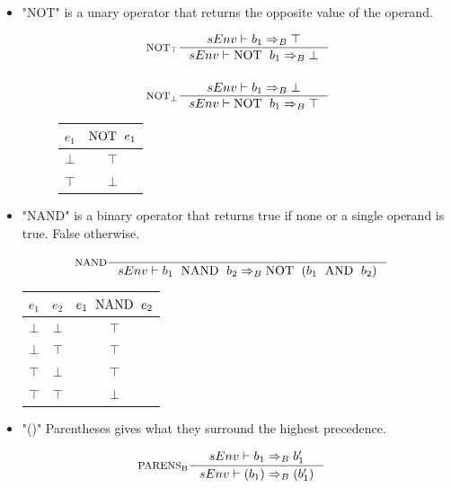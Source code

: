 \begin{itemize}
\item "NOT" is a unary operator that returns the opposite value of the operand.

\begin{figure}[H]
\centering
\begin{minipage}[c]{0.45\linewidth}
\centering
\begin{align*}
&\inference[$\text{NOT}_\top$]{sEnv \vdash b_1 \Rightarrow_B \top}
                       {sEnv \vdash \Tnot b_1 \Rightarrow_B \bot}
\\\\
&\inference[$\text{NOT}_\bot$]{sEnv \vdash b_1 \Rightarrow_B \bot}
                       {sEnv \vdash \Tnot b_1 \Rightarrow_B \top}
\end{align*}
\end{minipage}
\quad
\begin{minipage}[c]{0.45\linewidth}
\centering
\begin{tabular}{ | c | c | }
\hline
$e_1$ & $ \text{NOT \;} e_1$ \\\hline
$\bot$ & $\top$ \\\hline
$\top$ & $\bot$ \\\hline
\end{tabular}
\end{minipage}
\end{figure}

\item "NAND" is a binary operator that returns true if none or a single operand is true. False otherwise.

\begin{align*}
&\inference[NAND]{}
                   {sEnv \vdash b_1 \Tnand b_2 \Rightarrow_B \Tnot( b_1 \Tand b_2 )}
\end{align*}

\begin{center}
\begin{tabular}{ | c | c | c | }
\hline
$e_1$ & $e_2$ & $e_1 \text{\; NAND \;} e_2$ \\\hline
$\bot$ & $\bot$ & $\top$ \\\hline
$\bot$ & $\top$ & $\top$ \\\hline
$\top$ & $\bot$ & $\top$ \\\hline
$\top$ & $\top$ & $\bot$ \\\hline
\end{tabular}
\end{center}

\item "()" Parentheses gives what they surround the highest precedence.
  
\begin{align*}
&\inference[$\text{PARENS}_\text{B}$]{sEnv \vdash b_1 \Rightarrow_B b_1'}
                       {sEnv \vdash (b_1) \Rightarrow_B (b_1')}
\end{align*}
\end{itemize}

